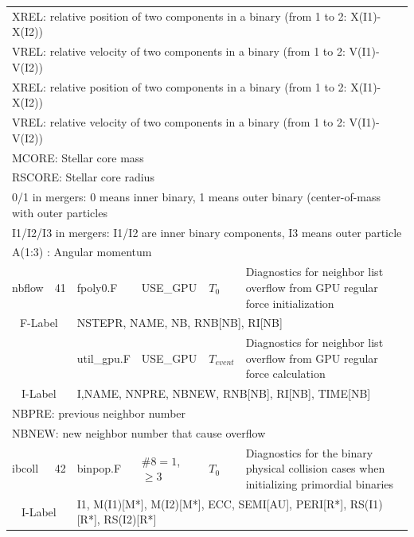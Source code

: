 \begin{longtable}{||p{0.42in}|p{0.25in}|p{0.6in}|p{0.6in}|p{0.4in}|p{2.3in}||}
\multicolumn{6}{|p{5.4in}|}{ XREL: relative position of two components in a binary (from 1 to 2: X(I1)-X(I2))}\\
\multicolumn{6}{|p{5.4in}|}{ VREL: relative velocity of two components in a binary (from 1 to 2: V(I1)-V(I2))}\\
\multicolumn{6}{|p{5.4in}|}{ XREL: relative position of two components in a binary (from 1 to 2: X(I1)-X(I2))}\\
\multicolumn{6}{|p{5.4in}|}{ VREL: relative velocity of two components in a binary (from 1 to 2: V(I1)-V(I2))}\\
\multicolumn{6}{|p{5.4in}|}{ MCORE: Stellar core mass }\\
\multicolumn{6}{|p{5.4in}|}{ RSCORE: Stellar core radius }\\
\multicolumn{6}{|p{5.4in}|}{ 0/1 in mergers: 0 means inner binary, 1 means outer binary (center-of-mass with outer particles}\\
\multicolumn{6}{|p{5.4in}|}{ I1/I2/I3 in mergers: I1/I2 are inner binary components, I3 means outer particle}\\
\multicolumn{6}{|p{5.4in}|}{ A(1:3) : Angular momentum}\\
\hline\hline

  nbflow     & 41  & fpoly0.F   & USE\_GPU& $T_0$         & Diagnostics for neighbor list overflow from GPU regular force initialization \\\hline
\multicolumn{2}{|c|}{ F-Label } & \multicolumn{4}{|p{4.4in}|}{ NSTEPR, NAME, NB, RNB[NB], RI[NB] }\\\hline
           &     &util\_gpu.F & USE\_GPU& $T_{event}$    & Diagnostics for neighbor list overflow from GPU regular force calculation \\\hline
\multicolumn{2}{|c|}{ I-Label } & \multicolumn{4}{|p{4.4in}|}{ I,NAME, NNPRE, NBNEW, RNB[NB], RI[NB], TIME[NB] }\\\hline
\multicolumn{6}{|p{5.4in}|}{ NBPRE: previous neighbor number }\\\hline
\multicolumn{6}{|p{5.4in}|}{ NBNEW: new neighbor number that cause overflow }\\\hline\hline

  ibcoll     & 42  & binpop.F   & $\#8=1$,$\geq3$& $T_0$         & Diagnostics for the binary physical collision cases when initializing primordial binaries \\\hline
\multicolumn{2}{|c|}{ I-Label } & \multicolumn{4}{|p{4.4in}|}{ I1, M(I1)[M*], M(I2)[M*], ECC, SEMI[AU], PERI[R*], RS(I1)[R*], RS(I2)[R*] }\\\hline\hline


\end{longtable}
